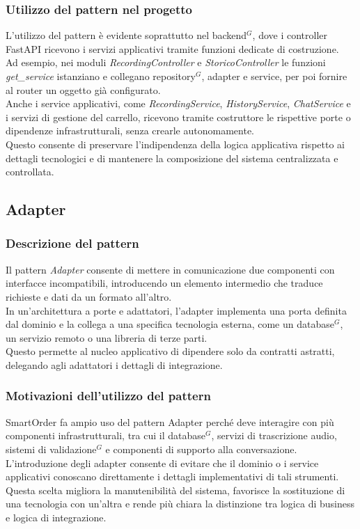 \subsubsection{Utilizzo del pattern nel progetto}
L'utilizzo del pattern è evidente soprattutto nel backend$^G$, dove i controller FastAPI ricevono i servizi applicativi tramite funzioni dedicate di costruzione.\\
Ad esempio, nei moduli \textit{RecordingController} e \textit{StoricoController} le funzioni \textit{get\_service} istanziano e collegano repository$^G$, adapter e service, per poi fornire al router un oggetto gi\`a configurato.\\
Anche i service applicativi, come \textit{RecordingService}, \textit{HistoryService}, \textit{ChatService} e i servizi di gestione del carrello, ricevono tramite costruttore le rispettive porte o dipendenze infrastrutturali, senza crearle autonomamente.\\
Questo consente di preservare l'indipendenza della logica applicativa rispetto ai dettagli tecnologici e di mantenere la composizione del sistema centralizzata e controllata.

\subsection{Adapter}
\subsubsection{Descrizione del pattern}
Il pattern \textit{Adapter} consente di mettere in comunicazione due componenti con interfacce incompatibili, introducendo un elemento intermedio che traduce richieste e dati da un formato all'altro.\\
In un'architettura a porte e adattatori, l'adapter implementa una porta definita dal dominio e la collega a una specifica tecnologia esterna, come un database$^G$, un servizio remoto o una libreria di terze parti.\\
Questo permette al nucleo applicativo di dipendere solo da contratti astratti, delegando agli adattatori i dettagli di integrazione.
\subsubsection{Motivazioni dell'utilizzo del pattern}
SmartOrder fa ampio uso del pattern Adapter perché deve interagire con più componenti infrastrutturali, tra cui il database$^G$, servizi di trascrizione audio, sistemi di validazione$^G$ e componenti di supporto alla conversazione.\\
L'introduzione degli adapter consente di evitare che il dominio o i service applicativi conoscano direttamente i dettagli implementativi di tali strumenti.\\
Questa scelta migliora la manutenibilità del sistema, favorisce la sostituzione di una tecnologia con un'altra e rende più chiara la distinzione tra logica di business e logica di integrazione.
